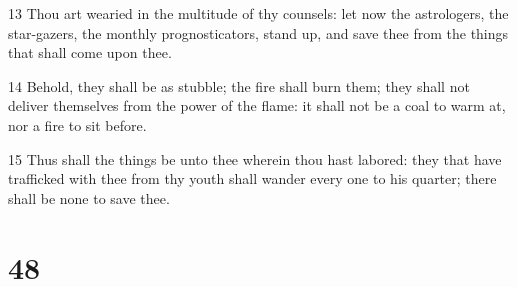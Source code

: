 \par 13 Thou art wearied in the multitude of thy counsels: let now the astrologers, the star-gazers, the monthly prognosticators, stand up, and save thee from the things that shall come upon thee.
\par 14 Behold, they shall be as stubble; the fire shall burn them; they shall not deliver themselves from the power of the flame: it shall not be a coal to warm at, nor a fire to sit before.
\par 15 Thus shall the things be unto thee wherein thou hast labored: they that have trafficked with thee from thy youth shall wander every one to his quarter; there shall be none to save thee.

\chapter{48}

